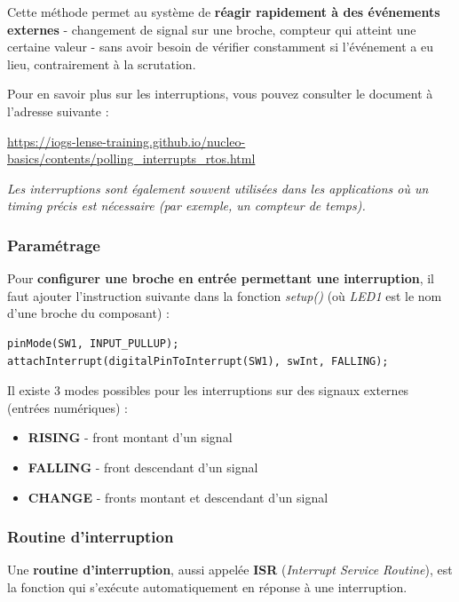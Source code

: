 \documentclass[a4paper,11pt,titlepage]{article} %
\begin{document}
Cette méthode permet au système de \textbf{réagir rapidement à des événements externes} - changement de signal sur une broche, compteur qui atteint une certaine valeur - sans avoir besoin de vérifier constamment si l'événement a eu lieu, contrairement à la scrutation. 

Pour en savoir plus sur les interruptions, vous pouvez consulter le document à l'adresse suivante :

\href{https://iogs-lense-training.github.io/nucleo-basics/contents/polling_interrupts_rtos.html}{https://iogs-lense-training.github.io/nucleo-basics/contents/polling\_interrupts\_rtos.html}

\textit{Les interruptions sont également souvent utilisées dans les applications où un timing précis est nécessaire (par exemple, un compteur de temps).}


\subsubsection{Paramétrage}

Pour \textbf{configurer une broche en entrée permettant une interruption}, il faut ajouter l'instruction suivante dans la fonction \textsl{setup()} (où \textsl{LED1} est le nom d'une broche du composant) :

\begin{lstlisting}
pinMode(SW1, INPUT_PULLUP);
attachInterrupt(digitalPinToInterrupt(SW1), swInt, FALLING); 
\end{lstlisting}

Il existe 3 modes possibles pour les interruptions sur des signaux externes (entrées numériques) : 

\begin{itemize}
	\item \textbf{RISING} - front montant d'un signal
	\item \textbf{FALLING} - front descendant d'un signal
	\item \textbf{CHANGE} - fronts montant et descendant d'un signal
\end{itemize}


\subsubsection{Routine d'interruption}

Une \textbf{routine d'interruption}, aussi appelée \textbf{ISR} (\textit{Interrupt Service Routine}), est la fonction qui s'exécute automatiquement en réponse à une interruption. 
\end{document}

